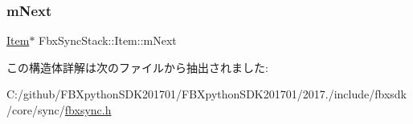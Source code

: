 \subsubsection{\texorpdfstring{m\+Next}{mNext}}
{\footnotesize\ttfamily \hyperlink{struct_fbx_sync_stack_1_1_item}{Item}$\ast$ Fbx\+Sync\+Stack\+::\+Item\+::m\+Next}



この構造体詳解は次のファイルから抽出されました\+:\begin{DoxyCompactItemize}
\item 
C\+:/github/\+F\+B\+Xpython\+S\+D\+K201701/\+F\+B\+Xpython\+S\+D\+K201701/2017./include/fbxsdk/core/sync/\hyperlink{fbxsync_8h}{fbxsync.\+h}\end{DoxyCompactItemize}

